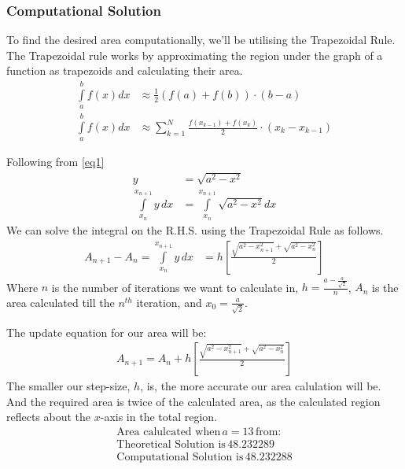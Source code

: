 \documentclass{beamer}
\providecommand{\sbrak}[1]{\ensuremath{{}\left[#1\right]}}
\providecommand{\brak}[1]{\ensuremath{\left(#1\right)}}
\theoremstyle{remark}
\numberwithin{equation}{section}
\begin{document}
		\begin{frame}
			\frametitle{\textbf{Computational Solution}}
			To find the desired area computationally, we'll be utilising the Trapezoidal Rule.\\
			The Trapezoidal rule works by approximating the region under the graph of a function as trapezoids and calculating their area.
			\begin{align}
				\int\limits_a^b f\brak{x}dx &\approx \frac{1}{2}\brak{f\brak{a}+f\brak{b}}\cdot\brak{b-a}\\
				\int\limits_a^b f\brak{x}dx &\approx \sum\limits_{k=1}^{N}\frac{f\brak{x_{k-1}}+f\brak{x_k}}{2}\cdot\brak{x_{k}-x_{k-1}}
			\end{align}
		\end{frame}
		\begin{frame}
			Following from \ref{eq1}
			\begin{align}
				y &= \sqrt{a^2-x^2} \nonumber\\
				\int\limits_{x_n}^{x_{n+1}} y \, dx &= \int\limits_{x_n}^{x_{n+1}} \sqrt{a^2-x^2} dx
			\end{align}
			We can solve the integral on the R.H.S. using the Trapezoidal Rule as follows.
			\begin{align}
				A_{n+1}-A_{n} = 	\int\limits_{x_n}^{x_{n+1}} y \, dx &= h\sbrak{\frac{\sqrt{a^2-x_{n+1}^2} + \sqrt{a^2-x_n^2}}{2}}
			\end{align}
			Where $n$ is the number of iterations we want to calculate in, $h = \frac{a-\frac{a}{\sqrt{2}}}{n}$, $A_{n}$ is the area calculated till the $n^{th}$ iteration, and $x_0 = \frac{a}{\sqrt{2}}$.
		\end{frame}
		\begin{frame}
			The update equation for our area will be:
			\begin{align}
				A_{n+1} = A_{n} +  h\sbrak{\frac{\sqrt{a^2-x_{n+1}^2} + \sqrt{a^2-x_n^2}}{2}}
			\end{align}
			The smaller our step-size, $h$, is, the more accurate our area calulation will be.\\
			And the required area is twice of the calculated area, as the calculated region reflects about the $x$-axis in the total region.
			\begin{align*}
				\text{Area calulcated when}\, a=13 \,\text{from:}\\
				\text{Theoretical Solution is}\, 48.232289\\
				\text{Computational Solution is}\, 48.232288
			\end{align*}
		\end{frame}
	
\end{document}
